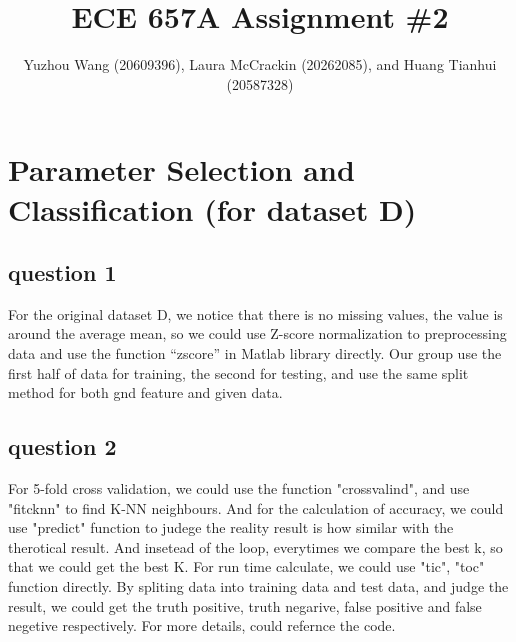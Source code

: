 \documentclass[]{article}
\title{ECE 657A Assignment \#2}
\author{Yuzhou Wang (20609396), Laura McCrackin (20262085), \newline and   Huang Tianhui (20587328)       }
\begin{document}
\maketitle



\section{Parameter Selection and Classification (for dataset D)}

\subsection{question 1}

For the original dataset D, we notice that there is no missing values, the value is around the average mean, so we could use Z-score normalization to preprocessing data and use the function “zscore” in Matlab library directly. Our group use the first half of data for training, the second for testing, and use the same split method for both gnd feature and given data.




\subsection{question 2}

For 5-fold cross validation, we could use the function "crossvalind", and use "fitcknn" to find K-NN neighbours. And for the calculation of accuracy, we could use "predict" function to judege the reality result is how similar with the therotical result. And insetead of the loop, everytimes we compare the best k, so that we could get the best K. For run time calculate, we could use "tic", "toc" function directly. By spliting data into training data and test data, and judge the result, we could get the truth positive, truth negarive, false positive and false negetive respectively. For more details, could refernce the code.
\end{document}
